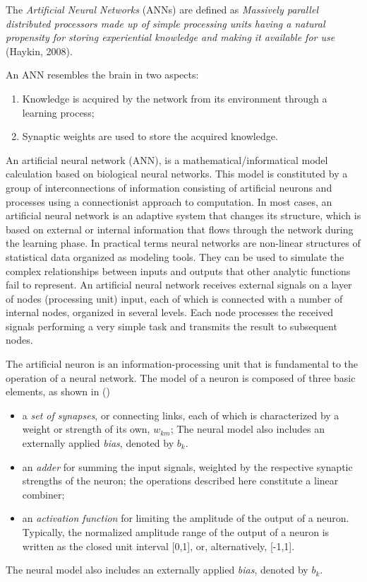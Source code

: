The \textit{Artificial Neural Networks} (ANNs) are defined as \textit{Massively parallel distributed processors made up of simple processing units having a natural propensity for storing experiential knowledge and making it available for use} (Haykin, 2008).

An ANN resembles the brain in two aspects:
\begin{enumerate}
	\item Knowledge is acquired by the network from its environment through a learning process;
	\item Synaptic weights are used to store the acquired knowledge.
\end{enumerate}

An artificial neural network (ANN), is a mathematical/informatical model calculation based on biological neural networks.
This model is constituted by a group of interconnections of information consisting of artificial neurons and processes using a connectionist approach to computation. In most cases, an artificial neural network is an adaptive system that changes its structure, which is based on external or internal information that flows through the network during the learning phase. 
In practical terms neural networks are non-linear structures of statistical data organized as modeling tools.
They can be used to simulate the complex relationships between inputs and outputs that other analytic functions fail to represent.
An artificial neural network receives external signals on a layer of nodes (processing unit) input, each of which is connected with a number of internal nodes, organized in several levels. Each node processes the received signals performing a very simple task  and transmits the result to subsequent nodes. 

The artificial neuron is an information-processing unit that is fundamental to the operation of a neural network. The model of a neuron is composed of three basic elements, as shown in () 
\begin{itemize}
	\item a \textit{set of synapses}, or connecting links, each of which is characterized by a weight or strength of its own, $w_{km}$; The neural model also includes an externally applied \textit{bias}, denoted by $b_k$.
	\item an \textit{adder} for summing the input signals, weighted by the respective synaptic strengths of the neuron; the operations described here constitute a linear combiner;
	\item an \textit{activation function} for limiting the amplitude of the output of a neuron. Typically, the normalized amplitude range of the output of a neuron is written as the closed unit interval [0,1], or, alternatively, [-1,1].
\end{itemize}
The neural model also includes an externally applied \textit{bias}, denoted by $b_k$.

